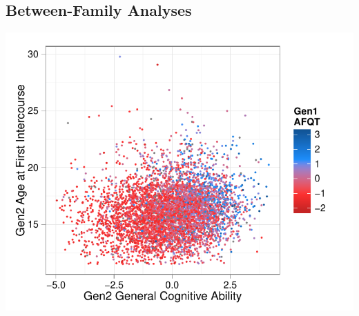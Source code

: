 \documentclass[a4paper,man,apacite,natbib,12pt,longtable,mask]{apa6}\usepackage[]{graphicx}\usepackage[]{color}
\newenvironment{knitrout}{}{} %
\begin{document}
\subsection{Between-Family Analyses}

%
\begin{landscape}\noindent\begin{minipage}{\linewidth}
\label{plot_gen2_afi}
\begin{center}
\begin{knitrout}
\color{fgcolor}
\includegraphics[width=.8\paperwidth]{figure/plot_gen2_afi-1} 

\end{knitrout}
\end{center}
\end{minipage}\end{landscape}
%
\end{document}
